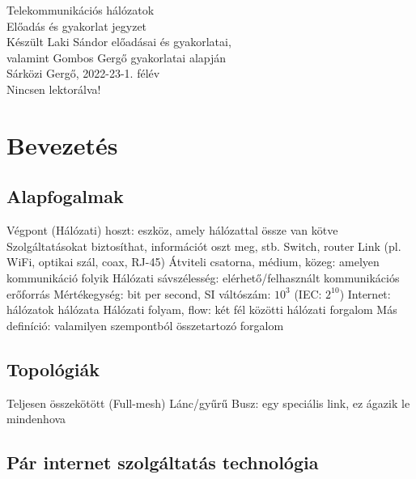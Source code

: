 \documentclass[12pt,a4paper]{article}
\begin{document}
\begin{center}
	\huge
	Telekommunikációs hálózatok\\
	\vspace{1mm}
	\LARGE
	Előadás és gyakorlat jegyzet\\
	\vspace{5mm}
	\large
	Készült Laki Sándor előadásai és gyakorlatai,\\
	valamint Gombos Gergő gyakorlatai alapján\\
	\vspace{5mm}
	Sárközi Gergő, 2022-23-1. félév\\
	Nincsen lektorálva!
\end{center}

\tableofcontents

\pagebreak

\section{Bevezetés}

\subsection{Alapfogalmak}

\begin{outline}
	\1 Végpont
		\2 (Hálózati) hoszt: eszköz, amely hálózattal össze van kötve
		\2 Szolgáltatásokat biztosíthat, információt oszt meg, stb.
	\1 Switch, router
	\1 Link (pl. WiFi, optikai szál, coax, RJ-45)
		\2 Átviteli csatorna, médium, közeg: amelyen kommunikáció folyik
	\1 Hálózati sávszélesség: elérhető/felhasznált kommunikációs erőforrás
		\2 Mértékegység: bit per second, SI váltószám: $10^3$ (IEC: $2^{10}$)
	\1 Internet: hálózatok hálózata
	\1 Hálózati folyam, flow: két fél közötti hálózati forgalom
		\2 Más definíció: valamilyen szempontból összetartozó forgalom
\end{outline}

\subsection{Topológiák}

\begin{outline}
	\1 Teljesen összekötött (Full-mesh)
	\1 Lánc/gyűrű
	\1 Busz: egy speciális link, ez ágazik le mindenhova
\end{outline}

\pagebreak

\subsection{Pár internet szolgáltatás technológia}
\end{document}

